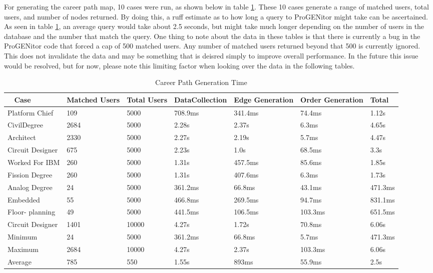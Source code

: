 For generating the career path map, 10 cases were run, as shown below in table
\ref{table:career performance}.  These 10 cases generate a range of matched
users, total users, and number of nodes returned.  By doing this, a ruff estimate as to how
long a query to ProGENitor might take can be ascertained.  As seen in table
\ref{table:career performance}, an average query would take about 2.5 seconds,
but might take much longer depending on the number of users in the database and the number that
match the query.  One thing to note about the data in these tables is that there
is currently a bug in the ProGENitor code that forced a cap of 500 matched
users.  Any number of matched users returned beyond that 500 is currently
ignored.  This does not invalidate the data and may be something that is deisred
simply to improve overall performance.  In the future this issue would be
resolved, but for now, please note this limiting factor when looking over the
data in the following tables.

\begin{table}[H]
  \centering
  \begin{tabular}{|p{17mm}|p{16mm}|p{10mm}|p{18mm}|p{19mm}|p{20mm}|p{14mm}|}
  \hline
  \
  Case&Matched Users&Total Users&Data\newline Collection&Edge\newline
  Generation&Order Generation&Total\\
  \hline\hline
  Platform Chief&109&5000&708.9ms&341.4ms&74.4ms&1.12s\\ \hline
  Civil\newline Degree&2684&5000&2.28s&2.37s&6.3ms&4.65s\\ \hline 
  Architect&2330&5000&2.27s&2.19s&5.7ms&4.47s\\ \hline
  Circuit Designer&675&5000&2.23s&1.0s&68.5ms&3.3s\\ \hline
  Worked For IBM&260&5000&1.31s&457.5ms&85.6ms&1.85s\\ \hline
  Fission Degree&260&5000&1.31s&407.6ms&6.3ms&1.73s\\ \hline
  Analog Degree&24&5000&361.2ms&66.8ms&43.1ms&471.3ms\\ \hline
  Embedded&55&5000&466.8ms&269.5ms&94.7ms&831.1ms\\ \hline
  Floor- \newline planning&49&5000&441.5ms&106.5ms&103.3ms&651.5ms\\ \hline
  Circuit Designer&1401&10000&4.27s&1.72s&70.8ms&6.06s\\ \hline
  \hline\hline
  Minimum&24&5000&361.2ms&66.8ms&5.7ms&471.3ms\\ \hline
  Maximum&2684&10000&4.27s&2.37s&103.3ms&6.06s\\ \hline
  Average&785&550&1.55s&893ms&55.9ms&2.5s\\ \hline
  \end{tabular}
  \label{table:career performance}
  \caption{Career Path Generation Time}
\end{table}

